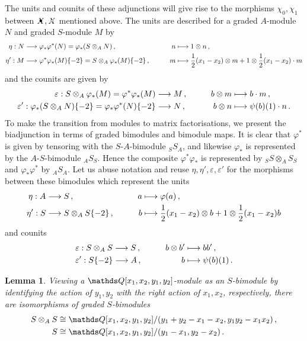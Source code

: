 \documentclass{compositio}
\newtheorem{lemma}[theorem]{Lemma}
\theoremstyle{definition}
\numberwithin{equation}{section}
\begin{document}
The units and counits of these adjunctions will give rise to the morphisms $\chi_0, \chi_1$ between $\Xbul, \Xcirc$ mentioned above. The units are described for a graded $A$-module $N$ and graded $S$-module $M$ by
\begin{align*}
\eta: N & \longrightarrow \varphi_* \varphi^*(N) = \varphi_*( S \otimes_A N ) \, , \qquad & n & \longmapsto 1 \otimes n \, ,\\
\eta': M & \longrightarrow \varphi^* \varphi_*(M)\{-2\} = S \otimes_A \varphi_*(M) \{-2\} \, , \qquad & m & \longmapsto \frac{1}{2}(x_1-x_2) \otimes m + 1 \otimes \frac{1}{2}(x_1 - x_2) \cdot m
\end{align*}
and the counits are given by
\begin{align*}
\varepsilon: S \otimes_A \varphi_*(M) = \varphi^* \varphi_*(M) & \longrightarrow M \, , \qquad & b \otimes m & \longmapsto b \cdot m \, ,\\
\varepsilon': \varphi_*(S \otimes_A N)\{-2\} = \varphi_*\varphi^*(N)\{-2\} & \longrightarrow N \, , \qquad & b \otimes n & \longmapsto \psi(b)(1) \cdot n \, .
\end{align*}
To make the transition from modules to matrix factorisations, we present the biadjunction in terms of graded bimodules and bimodule maps. It is clear that $\varphi^*$ is given by tensoring with the $S$-$A$-bimodule ${}_S S_A$, and likewise $\varphi_*$ is represented by the $A$-$S$-bimodule ${}_A S_S$. Hence the composite $\varphi^* \varphi_*$ is represented by ${}_S S \otimes_A S {}_S$ and $\varphi_* \varphi^*$ by ${}_A S {}_A$. Let us abuse notation and reuse $\eta, \eta', \varepsilon, \varepsilon'$ for the morphisms between these bimodules which represent the units
\begin{align*}
\eta: A & \longrightarrow S \, , \qquad & a & \longmapsto \varphi(a)\,,\\
\eta': S & \longrightarrow S \otimes_A S\{-2\} \, , \qquad & b &\longmapsto \frac{1}{2}(x_1 - x_2) \otimes b + 1 \otimes \frac{1}{2}(x_1 - x_2)b
\end{align*}
and counits
\begin{align*}
& \varepsilon: S \otimes_A S \longrightarrow S \, , \qquad & b \otimes b' & \longmapsto bb'\,,\\
& \varepsilon': S\{-2\} \longrightarrow A \, , \qquad & b & \longmapsto \psi(b)(1) \, . 
\end{align*}

\begin{lemma}\label{lemma:bimodules_as_algebras} Viewing a $\QQ[x_1,x_2,y_1,y_2]$-module as an $S$-bimodule by identifying the action of $y_1, y_2$ with the right action of $x_1, x_2$, respectively, there are isomorphisms of graded $S$-bimodules
\begin{align*}
S \otimes_A S & \cong \QQ[x_1,x_2,y_1,y_2]/(y_1 + y_2 - x_1 - x_2, y_1 y_2 - x_1 x_2) \, ,\\
S & \cong \QQ[x_1,x_2,y_1,y_2]/(y_1 - x_1, y_2 - x_2)\,.
\end{align*}
\end{lemma}
\end{document}
